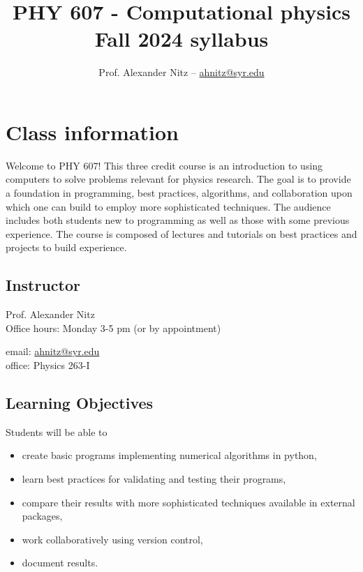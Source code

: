 \documentclass[12pt]{article}
\title{PHY 607 - Computational physics \\ Fall 2024 syllabus}
\author{Prof. Alexander Nitz -- \href{mailto:ahnitz@syr.edu}{ahnitz@syr.edu}}
\date{}
\begin{document}
\maketitle

\section*{Class information}

Welcome to PHY 607! This three credit course is an introduction to using computers to solve problems relevant for physics research. The goal is to provide a foundation in programming, best practices, algorithms, and collaboration upon which one can build to employ more sophisticated techniques. The audience includes both students new to programming as well as those with some previous experience. The course is composed of
lectures and tutorials on best practices and projects to build experience.

\subsection*{Instructor}

\begin{minipage}{0.5\textwidth}
  Prof. Alexander Nitz \\
  Office hours: Monday 3-5 pm (or by appointment)
\end{minipage}
\begin{minipage}{0.5\textwidth}
  \begin{flushright}
  email: \href{mailto:ahnitz@syr.edu}{ahnitz@syr.edu} \\
  office: Physics 263-I
  \end{flushright}
\end{minipage}

\subsection*{Learning Objectives}
Students will be able to
\begin{itemize}
\item create basic programs implementing numerical algorithms in python,
\item learn best practices for validating and testing their programs,
\item compare their results with more sophisticated techniques available in external packages,
\item work collaboratively using version control,
\item document results.
\end{itemize}
\end{document}
